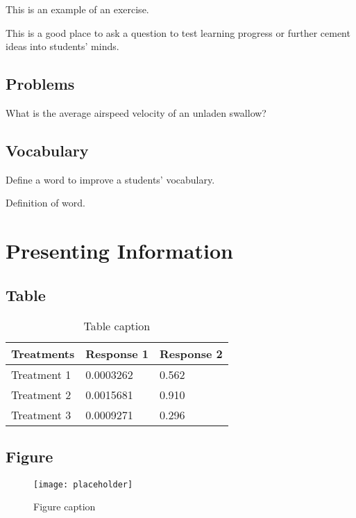 	This is an example of an exercise.
	
	\begin{exercise}
		This is a good place to ask a question to test learning progress or further cement ideas into students' minds.
	\end{exercise}
	
	
	\section{Problems}
	
	\begin{problem}
		What is the average airspeed velocity of an unladen swallow?
	\end{problem}
	
	
	\section{Vocabulary}
	
	Define a word to improve a students' vocabulary.
	
	\begin{vocabulary}[Word]
		Definition of word.
	\end{vocabulary}
	
	
	
	
	\chapter{Presenting Information}
	
	\section{Table}
	
	\begin{table}[h]
		\centering
		\begin{tabular}{l l l}
			\toprule
			\textbf{Treatments} & \textbf{Response 1} & \textbf{Response 2}\\
			\midrule
			Treatment 1 & 0.0003262 & 0.562 \\
			Treatment 2 & 0.0015681 & 0.910 \\
			Treatment 3 & 0.0009271 & 0.296 \\
			\bottomrule
		\end{tabular}
		\caption{Table caption}
	\end{table}
	
	
	\section{Figure}
	
	\begin{figure}[h]
		\centering\texttt{[image: placeholder]}
		\caption{Figure caption}
	\end{figure}